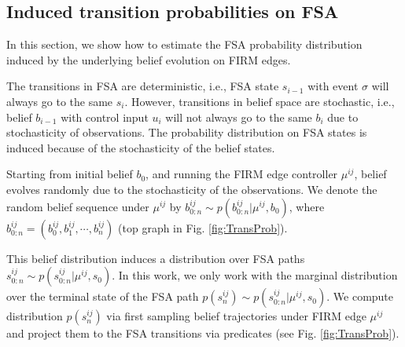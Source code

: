 \documentclass[conference]{IEEEtran}
\begin{document}







\subsection{Induced transition probabilities on FSA} \label{sec:TransProbSec}
In this section, we show how to estimate the FSA probability distribution induced by the underlying belief evolution on FIRM edges. 

The transitions in FSA are deterministic, i.e., FSA state $s_{i-1}$ with event $\sigma$ will always go to the same $s_{i}$. However, transitions in belief space are stochastic, i.e., belief $b_{i-1}$ with control input $u_{i}$ will not always go to the same $b_{i}$ due to stochasticity of observations.
The probability distribution on FSA states is induced because of the stochasticity of the belief states.

Starting from initial belief $b_{0}$, and running the FIRM edge controller $\mu^{ij}$, belief evolves randomly due to the stochasticity of the observations. We denote the random belief sequence under $\mu^{ij}$ by $b_{0:n}^{ij}\sim p(b_{0:n}^{ij}|\mu^{ij},b_0)$, where $b_{0:n}^{ij}=(b_0^{ij},b_1^{ij},\cdots,b_n^{ij})$ (top graph in Fig. \ref{fig:TransProb}).

This belief distribution induces a distribution over FSA paths $s_{0:n}^{ij}\sim p(s_{0:n}^{ij}|\mu^{ij},s_0)$. 
In this work, we only work with the marginal distribution over the terminal state of the FSA path $p(s_{n}^{ij})\sim p(s_{0:n}^{ij}|\mu^{ij},s_0)$. We compute distribution $p(s_{n}^{ij})$ via first sampling belief trajectories under FIRM edge $\mu^{ij}$ and project them to the FSA transitions via predicates (see Fig. \ref{fig:TransProb}).
\end{document}

